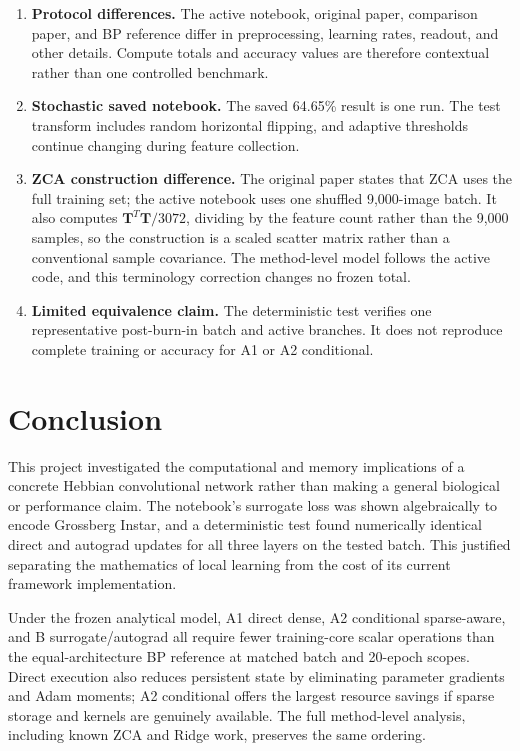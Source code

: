 \documentclass{article}
\begin{document}
\begin{enumerate}[noitemsep]
    \item \textbf{Protocol differences.} The active notebook, original paper, comparison paper, and BP reference differ in preprocessing, learning rates, readout, and other details. Compute totals and accuracy values are therefore contextual rather than one controlled benchmark.
    \item \textbf{Stochastic saved notebook.} The saved 64.65\% result is one run. The test transform includes random horizontal flipping, and adaptive thresholds continue changing during feature collection.
    \item \textbf{ZCA construction difference.} The original paper states that ZCA uses the full training set; the active notebook uses one shuffled 9,000-image batch. It also computes $\mathbf{T}^T \mathbf{T} / 3072$, dividing by the feature count rather than the 9,000 samples, so the construction is a scaled scatter matrix rather than a conventional sample covariance. The method-level model follows the active code, and this terminology correction changes no frozen total.
    \item \textbf{Limited equivalence claim.} The deterministic test verifies one representative post-burn-in batch and active branches. It does not reproduce complete training or accuracy for A1 or A2 conditional.
    \end{enumerate}
    
    \section{Conclusion}
    
    This project investigated the computational and memory implications of a concrete Hebbian convolutional network rather than making a general biological or performance claim. The notebook's surrogate loss was shown algebraically to encode Grossberg Instar, and a deterministic test found numerically identical direct and autograd updates for all three layers on the tested batch. This justified separating the mathematics of local learning from the cost of its current framework implementation.
    
    Under the frozen analytical model, A1 direct dense, A2 conditional sparse-aware, and B surrogate/autograd all require fewer training-core scalar operations than the equal-architecture BP reference at matched batch and 20-epoch scopes. Direct execution also reduces persistent state by eliminating parameter gradients and Adam moments; A2 conditional offers the largest resource savings if sparse storage and kernels are genuinely available. The full method-level analysis, including known ZCA and Ridge work, preserves the same ordering.
    
\end{document}
